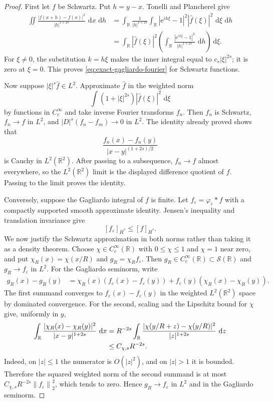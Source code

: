 \documentclass[11pt,oneside]{book}
\theoremstyle{definition}
\theoremstyle{remark}
\newcommand{\R}{\mathbb R}
\newcommand{\1}{\mathbf 1}
\newcommand{\dd}{\,\mathrm d}
\newcommand{\norm}[1]{\left\lVert #1\right\rVert}
\newcommand{\e}{\mathrm e}
\newcommand{\eps}{\varepsilon}
\begin{document}
\begin{proof}
First let $f$ be Schwartz.  Put $h=y-x$.  Tonelli and Plancherel give
\begin{align*}
 \iint\frac{|f(x+h)-f(x)|^2}{|h|^{1+2s}}\,\dd x\,\dd h
 &=\int_\R\frac1{|h|^{1+2s}}
   \int_\R|\e^{ih\xi}-1|^2|\widehat f(\xi)|^2\,\dd\xi\,\dd h\\
 &=\int_\R|\widehat f(\xi)|^2
   \left(\int_\R\frac{|\e^{ih\xi}-1|^2}{|h|^{1+2s}}\,\dd h\right)\dd\xi.
\end{align*}
For $\xi\ne0$, the substitution $k=h\xi$ makes the inner integral equal to
$c_s|\xi|^{2s}$; it is zero at $\xi=0$.  This proves
\eqref{eq:exact-gagliardo-fourier} for Schwartz functions.

Now suppose $|\xi|^s\widehat f\in L^2$.  Approximate $\widehat f$ in the
weighted norm
\[
 \int(1+|\xi|^{2s})|\widehat f(\xi)|^2\,\dd\xi
\]
by functions in $C_c^\infty$ and take inverse Fourier transforms $f_n$.
Then $f_n$ is Schwartz, $f_n\to f$ in $L^2$, and
$|D|^s(f_n-f_m)\to0$ in $L^2$.  The identity already proved shows that
\[
 \frac{f_n(x)-f_n(y)}{|x-y|^{(1+2s)/2}}
\]
is Cauchy in $L^2(\R^2)$.  After passing to a subsequence, $f_n\to f$ almost
everywhere, so the $L^2(\R^2)$ limit is the displayed difference quotient
of $f$.  Passing to the limit proves the identity.

Conversely, suppose the Gagliardo integral of $f$ is finite.  Let
$f_\eps=\varphi_\eps*f$ with a compactly supported smooth approximate
identity.  Jensen's inequality and translation invariance give
\[
 [f_\eps]_{\dot H^s}\le[f]_{\dot H^s}.
\]
We now justify the Schwartz approximation in both norms rather than taking it
as a density theorem.  Choose $\chi\in C_c^\infty(\R)$ with
$0\le\chi\le1$ and $\chi=1$ near zero, and put
$\chi_R(x)=\chi(x/R)$ and $g_R=\chi_Rf_\eps$.  Then
$g_R\in C_c^\infty(\R)\subset\mathcal S(\R)$ and
$g_R\to f_\eps$ in $L^2$.  For the Gagliardo seminorm, write
\begin{align*}
 g_R(x)-g_R(y)
 &=\chi_R(x)(f_\eps(x)-f_\eps(y))
   +f_\eps(y)(\chi_R(x)-\chi_R(y)).
\end{align*}
The first summand converges to $f_\eps(x)-f_\eps(y)$ in the weighted
$L^2(\R^2)$ space by dominated convergence.  For the second, scaling and
the Lipschitz bound for $\chi$ give, uniformly in $y$,
\begin{align}
 \int_\R\frac{|\chi_R(x)-\chi_R(y)|^2}{|x-y|^{1+2s}}\,\dd x
 &=R^{-2s}\int_\R
   \frac{|\chi(y/R+z)-\chi(y/R)|^2}{|z|^{1+2s}}\,\dd z\notag\\
 &\le C_{\chi,s}R^{-2s}.                         \label{eq:cutoff-gagliardo-error}
\end{align}
Indeed, on $|z|\le1$ the numerator is $O(|z|^2)$, and on
$|z|>1$ it is bounded.  Therefore the squared weighted norm of the second
summand is at most
$C_{\chi,s}R^{-2s}\norm{f_\eps}_2^2$, which tends to zero.  Hence
$g_R\to f_\eps$ in $L^2$ and in the Gagliardo seminorm.


\end{proof}
\end{document}

